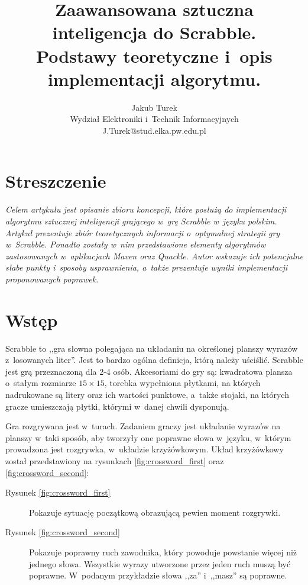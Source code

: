 \documentclass[a4paper,twocolumn,11pt]{article}
\title{{\mycfsb{14} Zaawansowana sztuczna inteligencja do Scrabble.} \\ {\mycfsb{14} Podstawy teoretyczne i~opis implementacji algorytmu.}}
\author{{\mycfs{12} Jakub Turek} \\ {\mycfs{11} Wydział Elektroniki i~Technik Informacyjnych} \\ {\mycfs{11} J.Turek@stud.elka.pw.edu.pl}}
\date{}
\theoremstyle{definition}
\begin{document}
\vspace{1.5cm}

\maketitle

\section*{Streszczenie}

\emph{Celem artykułu jest opisanie zbioru koncepcji, które posłużą do implementacji algorytmu sztucznej inteligencji grającego w~grę Scrabble w~języku polskim. Artykuł prezentuje zbiór teoretycznych informacji o~optymalnej strategii gry w~Scrabble. Ponadto zostały w~nim przedstawione elementy algorytmów zastosowanych w~aplikacjach Maven oraz Quackle. Autor wskazuje ich potencjalne słabe punkty i~sposoby usprawnienia, a~także prezentuje wyniki implementacji proponowanych poprawek.}

\section{Wstęp}

Scrabble to ,,gra słowna polegająca na układaniu na określonej planszy wyrazów z~losowanych liter''. \cite{scrabble_definition} Jest to bardzo ogólna definicja, którą należy uściślić. Scrabble jest grą przeznaczoną dla 2-4 osób. Akcesoriami do gry są: kwadratowa plansza o~stałym rozmiarze $15 \times 15$, torebka wypełniona płytkami, na których nadrukowane są litery oraz ich wartości punktowe, a~także stojaki, na których gracze umieszczają płytki, którymi w~danej chwili dysponują.

Gra rozgrywana jest w~turach. Zadaniem graczy jest układanie wyrazów na planszy w~taki sposób, aby tworzyły one poprawne słowa w~języku, w~którym prowadzona jest rozgrywka, w~układzie krzyżówkowym. Układ krzyżówkowy został przedstawiony na rysunkach \ref{fig:crossword_first} oraz \ref{fig:crossword_second}:

\begin{description}
 \item [Rysunek \ref{fig:crossword_first}] Pokazuje sytuację początkową obrazującą pewien moment rozgrywki.
 \item [Rysunek \ref{fig:crossword_second}] Pokazuje poprawny ruch zawodnika, który powoduje powstanie więcej niż jednego słowa. Wszystkie wyrazy utworzone przez jeden ruch muszą być poprawne. W~podanym przykładzie słowa ,,za'' i~,,masz'' są poprawne.
\end{description}
\end{document}
